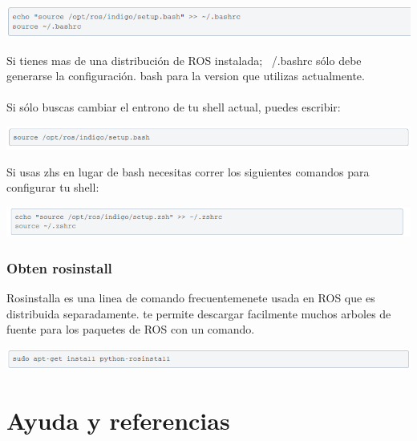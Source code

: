 \documentclass[a4paper]{book}
\begin{document}
\begin{center}
\includegraphics[width=1.2\textwidth]{Figures/Software/Install_ROS/Paso_14.png}
\end{center}

Si tienes mas de una distribución de ROS instalada; ~/.bashrc sólo debe generarse la configuración. bash para la version que utilizas actualmente.\\
\\
Si sólo buscas cambiar el entrono de tu shell actual, puedes escribir:

\begin{center}
\includegraphics[width=1.2\textwidth]{Figures/Software/Install_ROS/Paso_15.png}
\end{center}

Si usas zhs en lugar de bash necesitas correr los siguientes comandos para configurar tu shell:

\begin{center}
\includegraphics[width=1.2\textwidth]{Figures/Software/Install_ROS/Paso_16.png}
\end{center}

\subsection{Obten rosinstall}

Rosinstalla es una linea de comando frecuentemenete usada en ROS que es distribuida separadamente. te permite descargar facilmente muchos arboles de fuente para los paquetes de ROS con un comando.

\begin{center}
\includegraphics[width=1.2\textwidth]{Figures/Software/Install_ROS/Paso_17.png}
\end{center}


\chapter{Ayuda y referencias}
\end{document}
